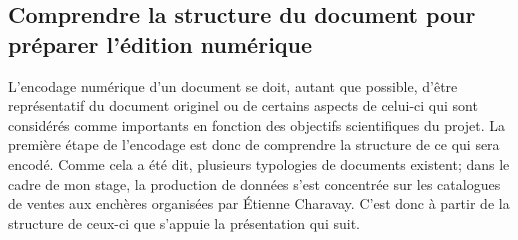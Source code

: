 \subsection{Comprendre la structure du document pour préparer l'édition numérique}
L'encodage numérique d'un document se doit, autant que possible, d'être représentatif du document originel ou de certains aspects de celui-ci qui sont considérés comme importants en fonction des objectifs scientifiques du projet. La première étape de l'encodage est donc de comprendre la structure de ce qui sera encodé. Comme cela a été dit, plusieurs typologies de documents existent; dans le cadre de mon stage, la production de données s'est concentrée sur les catalogues de ventes aux enchères organisées par Étienne Charavay. C'est donc à partir de la structure de ceux-ci que s'appuie la présentation qui suit.

